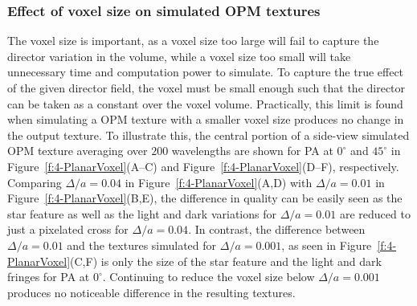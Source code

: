 \subsubsection{Effect of voxel size on simulated OPM textures}
The voxel size is important, as a voxel size too large will fail to capture the director variation in the volume, while a voxel size too small will take unnecessary time and computation power to simulate.
To capture the true effect of the given director field, the voxel must be small enough such that the director can be taken as a constant over the voxel volume.
Practically, this limit is found when simulating a OPM texture with a smaller voxel size produces no change in the output texture.
To illustrate this, the central portion of a side-view simulated OPM texture averaging over $200$ wavelengths are shown for PA at $0^{\circ}$ and $45^{\circ}$ in Figure~\ref{f:4-PlanarVoxel}(A--C) and Figure~\ref{f:4-PlanarVoxel}(D--F), respectively.
Comparing $\Delta /a = 0.04$ in Figure~\ref{f:4-PlanarVoxel}(A,D) with $\Delta /a = 0.01$ in Figure~\ref{f:4-PlanarVoxel}(B,E), the difference in quality can be easily seen as the star feature as well as the light and dark variations for $\Delta /a = 0.01$ are reduced to just a pixelated cross for $\Delta /a = 0.04$.
In contrast, the difference between $\Delta /a = 0.01$ and the textures simulated for $\Delta /a = 0.001$, as seen in Figure~\ref{f:4-PlanarVoxel}(C,F) is only the size of the star feature and the light and dark fringes for PA at $0^{\circ}$.
Continuing to reduce the voxel size below $\Delta /a = 0.001$ produces no noticeable difference in the resulting textures.


